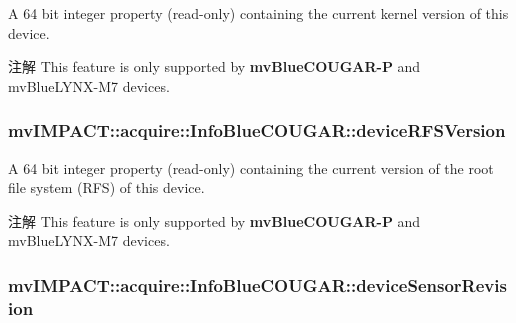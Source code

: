A 64 bit integer property {\bfseries }(read-\/only) containing the current kernel version of this device. 

\begin{DoxyNote}{注解}
This feature is only supported by {\bfseries mv\+Blue\+C\+O\+U\+G\+A\+R-\/\+P} and mv\+Blue\+L\+Y\+N\+X-\/\+M7 devices. 
\end{DoxyNote}
\hypertarget{classmv_i_m_p_a_c_t_1_1acquire_1_1_info_blue_c_o_u_g_a_r_ad94804e931336b7f298d8a7e44b34117}{
\subsubsection[{device\+R\+F\+S\+Version}]{ mv\+I\+M\+P\+A\+C\+T\+::acquire\+::\+Info\+Blue\+C\+O\+U\+G\+A\+R\+::device\+R\+F\+S\+Version}}\label{classmv_i_m_p_a_c_t_1_1acquire_1_1_info_blue_c_o_u_g_a_r_ad94804e931336b7f298d8a7e44b34117}


A 64 bit integer property {\bfseries }(read-\/only) containing the current version of the root file system (R\+F\+S) of this device. 

\begin{DoxyNote}{注解}
This feature is only supported by {\bfseries mv\+Blue\+C\+O\+U\+G\+A\+R-\/\+P} and mv\+Blue\+L\+Y\+N\+X-\/\+M7 devices. 
\end{DoxyNote}
\hypertarget{classmv_i_m_p_a_c_t_1_1acquire_1_1_info_blue_c_o_u_g_a_r_a62de019282d54684c8ac4da32d625faa}{
\subsubsection[{device\+Sensor\+Revision}]{ mv\+I\+M\+P\+A\+C\+T\+::acquire\+::\+Info\+Blue\+C\+O\+U\+G\+A\+R\+::device\+Sensor\+Revision}}\label{classmv_i_m_p_a_c_t_1_1acquire_1_1_info_blue_c_o_u_g_a_r_a62de019282d54684c8ac4da32d625faa}


